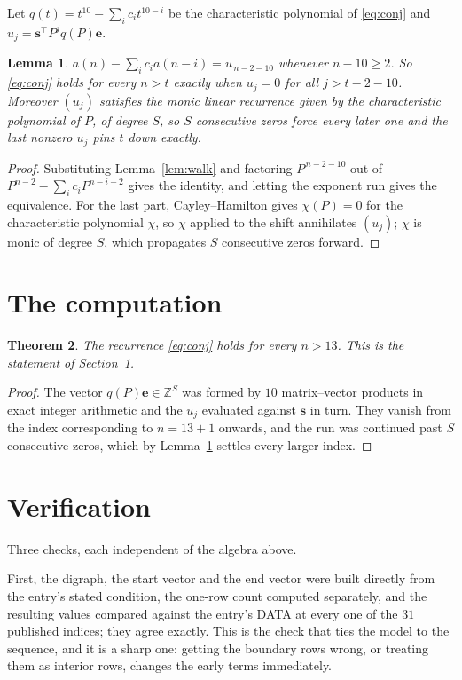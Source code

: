 \documentclass[11pt,a4paper]{article}
\theoremstyle{plain}
\newtheorem{theorem}{Theorem}
\newtheorem{lemma}[theorem]{Lemma}
\theoremstyle{definition}
\begin{document}
Let $q(t)=t^{10}-\sum_i c_i t^{10-i}$ be the characteristic polynomial of
\eqref{eq:conj} and $u_j=\mathbf{s}^{\!\top}P^{j}q(P)\mathbf{e}$.

\begin{lemma}\label{lem:crit}
$a(n)-\sum_i c_i a(n-i)=u_{\,n-2-10}$ whenever $n-10\ge2$. So \eqref{eq:conj}
holds for every $n>t$ exactly when $u_j=0$ for all $j>t-2-10$. Moreover $(u_j)$
satisfies the monic linear recurrence given by the characteristic polynomial of $P$, of
degree $S$, so $S$ consecutive zeros force every later one and the last nonzero $u_j$ pins
$t$ down exactly.
\end{lemma}

\begin{proof}
Substituting Lemma~\ref{lem:walk} and factoring $P^{\,n-2-10}$ out of
$P^{n-2}-\sum_i c_i P^{n-i-2}$ gives the identity, and letting the exponent run gives the
equivalence. For the last part, Cayley--Hamilton gives $\chi(P)=0$ for the characteristic
polynomial $\chi$, so $\chi$ applied to the shift annihilates $(u_j)$; $\chi$ is monic of
degree $S$, which propagates $S$ consecutive zeros forward.
\end{proof}

\section{The computation}

\begin{theorem}
The recurrence \eqref{eq:conj} holds for every $n>13$. This is the statement of
Section~1.
\end{theorem}

\begin{proof}
The vector $q(P)\mathbf{e}\in\mathbb{Z}^{S}$ was formed by $10$ matrix--vector
products in exact integer arithmetic and the $u_j$ evaluated against $\mathbf{s}$ in turn.
They vanish from the index corresponding to $n=13+1$ onwards, and the run was continued
past $S$ consecutive zeros, which by Lemma~\ref{lem:crit} settles every larger index.
\end{proof}

\section{Verification}

Three checks, each independent of the algebra above.

First, the digraph, the start vector and the end vector were built directly from the
entry's stated condition, the one-row count computed separately, and the resulting values
compared against the entry's DATA at every one of the $31$ published indices; they
agree exactly. This is the check that ties the model to the sequence, and it is a sharp one:
getting the boundary rows wrong, or treating them as interior rows, changes the early terms
immediately.
\end{document}

